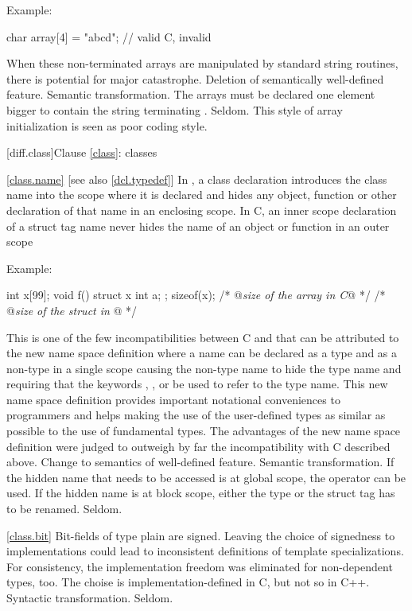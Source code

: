 Example:

\begin{codeblock}
char array[4] = "abcd";         // valid C, invalid \Cpp
\end{codeblock}
\rationale
When these non-terminated arrays are manipulated by standard
string routines, there is potential for major catastrophe.
\effect
Deletion of semantically well-defined feature.
\difficulty
Semantic transformation.
The arrays must be declared one element bigger to contain the
string terminating .
\howwide
Seldom.
This style of array initialization is seen as poor coding style.

[diff.class]{Clause \ref{class}: classes}

\ref{class.name} [see also \ref{dcl.typedef}]
\change In \Cpp, a class declaration introduces the class name into the scope where it is
declared and hides any object, function or other declaration of that name in an enclosing
scope. In C, an inner scope declaration of a struct tag name never hides the name of an
object or function in an outer scope

Example:

\begin{codeblock}
int x[99];
void f() {
  struct x { int a; };
  sizeof(x);  /* @\textit{\textrm{size of the array in C}}@ */
  /* @\textit{\textrm{size of the struct in \Cpp}}@ */
}
\end{codeblock}
\rationale
This is one of the few incompatibilities between C and \Cpp that
can be attributed to the new \Cpp name space definition where a
name can be declared as a type and as a non-type in a single scope
causing the non-type name to hide the type name and requiring that
the keywords , ,  or  be used to refer to the type name.
This new name space definition provides important notational
conveniences to \Cpp programmers and helps making the use of the
user-defined types as similar as possible to the use of fundamental
types.
The advantages of the new name space definition were judged to
outweigh by far the incompatibility with C described above.
\effect
Change to semantics of well-defined feature.
\difficulty
Semantic transformation.
If the hidden name that needs to be accessed is at global scope,
the \tcode{::} \Cpp operator can be used.
If the hidden name is at block scope, either the type or the struct
tag has to be renamed.
\howwide
Seldom.

\ref{class.bit}
\change
{}%
Bit-fields of type plain  are signed.
\rationale
Leaving the choice of signedness to implementations could lead to
inconsistent definitions of template specializations. For consistency,
the implementation freedom was eliminated for non-dependent types,
too.
\effect
The choise is implementation-defined in C, but not so in C++.
\difficulty
Syntactic transformation.
\howwide
Seldom.

